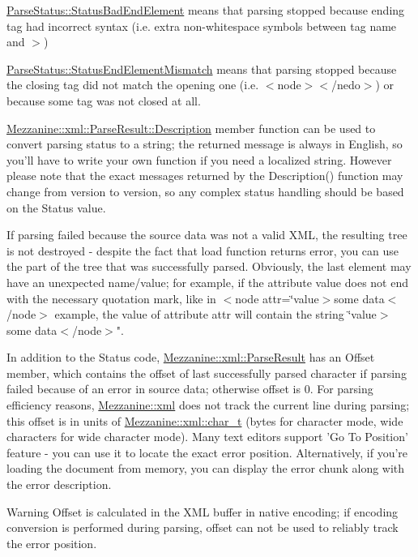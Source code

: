 \begin{DoxyItemize}
\item \hyperlink{namespaceMezzanine_1_1xml_a119489767bc2293563aef2066d960796}{ParseStatus::StatusBadEndElement} means that parsing stopped because ending tag had incorrect syntax (i.e. extra non-\/whitespace symbols between tag name and $>$)
\item \hyperlink{namespaceMezzanine_1_1xml_a119489767bc2293563aef2066d960796}{ParseStatus::StatusEndElementMismatch} means that parsing stopped because the closing tag did not match the opening one (i.e. $<$node$>$$<$/nedo$>$) or because some tag was not closed at all.
\end{DoxyItemize}

\hyperlink{structMezzanine_1_1xml_1_1ParseResult_a212f19dc618fbb4adc1e438cdf0fef6c}{Mezzanine::xml::ParseResult::Description} member function can be used to convert parsing status to a string; the returned message is always in English, so you'll have to write your own function if you need a localized string. However please note that the exact messages returned by the Description() function may change from version to version, so any complex status handling should be based on the Status value. \par
 \par
 If parsing failed because the source data was not a valid XML, the resulting tree is not destroyed -\/ despite the fact that load function returns error, you can use the part of the tree that was successfully parsed. Obviously, the last element may have an unexpected name/value; for example, if the attribute value does not end with the necessary quotation mark, like in $<$node attr=\char`\"{}value$>$some data$<$/node$>$ example, the value of attribute attr will contain the string \char`\"{}value$>$some data$<$/node$>$". \par
 \par
 In addition to the Status code, \hyperlink{structMezzanine_1_1xml_1_1ParseResult}{Mezzanine::xml::ParseResult} has an Offset member, which contains the offset of last successfully parsed character if parsing failed because of an error in source data; otherwise offset is 0. For parsing efficiency reasons, \hyperlink{namespaceMezzanine_1_1xml}{Mezzanine::xml} does not track the current line during parsing; this offset is in units of \hyperlink{namespaceMezzanine_1_1xml_a29b8a47c179e9895c4e9e66c45d1dbbc}{Mezzanine::xml::char\_\-t} (bytes for character mode, wide characters for wide character mode). Many text editors support 'Go To Position' feature -\/ you can use it to locate the exact error position. Alternatively, if you're loading the document from memory, you can display the error chunk along with the error description. \begin{DoxyWarning}{Warning}
Offset is calculated in the XML buffer in native encoding; if encoding conversion is performed during parsing, offset can not be used to reliably track the error position.
\end{DoxyWarning}
